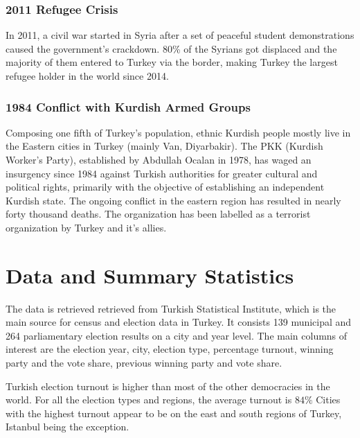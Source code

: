 \documentclass[12pt]{article}
\begin{document}
\subsubsection{2011 Refugee Crisis}

In 2011, a civil war started in Syria after a set of peaceful student demonstrations caused the government's crackdown. 80\% of the Syrians got displaced and the majority of them entered to Turkey via the border, making Turkey the largest refugee holder in the world since 2014. 

\subsubsection{1984 Conflict with Kurdish Armed Groups}

Composing one fifth of Turkey's population, ethnic Kurdish people mostly live in the Eastern cities in Turkey (mainly Van, Diyarbakir). The PKK (Kurdish Worker's Party), established by Abdullah Ocalan in 1978, has waged an insurgency since 1984 against Turkish authorities for greater cultural and political rights, primarily with the objective of establishing an independent Kurdish state. The ongoing conflict in the eastern region has resulted in nearly forty thousand deaths. The organization has been labelled as a terrorist organization by Turkey and it's allies. 


\section{Data and Summary Statistics}

The data is retrieved retrieved from Turkish Statistical Institute, which is the main source for census and election data in Turkey. It consists 139 municipal and 264 parliamentary election results on a city and year level. The main columns of interest are the election year, city, election type, percentage turnout, winning party and the vote share, previous winning party and vote share. 

Turkish election turnout is higher than most of the other democracies in the world. For all the election types and regions, the average turnout is $84\%$ Cities with the highest turnout appear to be on the east and south regions of Turkey, Istanbul being the exception. 
\end{document}
